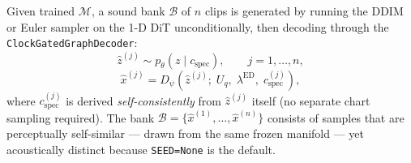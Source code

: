 \documentclass[12pt,a4paper]{article}
\begin{document}
Given trained $\mathcal{M}$, a sound bank $\mathcal{B}$ of $n$ clips is
generated by running the DDIM or Euler sampler on the 1-D DiT
unconditionally, then decoding through the
\texttt{ClockGatedGraphDecoder}:
\begin{equation}
  \hat{z}^{(j)} \sim p_\theta(z \mid c_{\mathrm{spec}}),
  \qquad j = 1, \ldots, n,
  \label{eq:sampling}
\end{equation}
\begin{equation}
  \hat{x}^{(j)} = D_\psi\!\left(\hat{z}^{(j)};\;
    U_q,\; \lambda^{\mathrm{ED}},\; c_{\mathrm{spec}}^{(j)}\right),
  \label{eq:decoding}
\end{equation}
where $c_{\mathrm{spec}}^{(j)}$ is derived \emph{self-consistently} from
$\hat{z}^{(j)}$ itself (no separate chart sampling required). The bank
$\mathcal{B} = \{\hat{x}^{(1)}, \ldots, \hat{x}^{(n)}\}$ consists of
samples that are perceptually self-similar — drawn from the same frozen
manifold — yet acoustically distinct because \texttt{SEED=None} is the
default.
\end{document}

